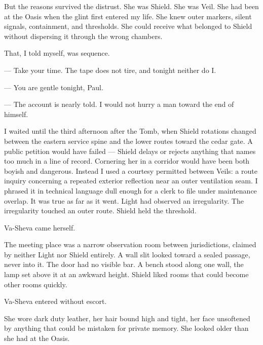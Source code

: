 But the reasons survived the distrust. She was Shield. She was Veil. She had been at the Oasis when the glint first entered my life. She knew outer markers, silent signals, containment, and thresholds. She could receive what belonged to Shield without dispersing it through the wrong chambers.\par

That, I told myself, was sequence.\par

\ornament

\begin{room}

--- Take your time. The tape does not tire, and tonight neither do I.

--- You are gentle tonight, Paul.

--- The account is nearly told. I would not hurry a man toward the end of himself.

\end{room}

\ornament

I waited until the third afternoon after the Tomb, when Shield rotations changed between the eastern service spine and the lower routes toward the cedar gate. A public petition would have failed --- Shield delays or rejects anything that names too much in a line of record. Cornering her in a corridor would have been both boyish and dangerous. Instead I used a courtesy permitted between Veils: a route inquiry concerning a repeated exterior reflection near an outer ventilation seam. I phrased it in technical language dull enough for a clerk to file under maintenance overlap. It was true as far as it went. Light had observed an irregularity. The irregularity touched an outer route. Shield held the threshold.\par

Va-Sheva came herself.\par

The meeting place was a narrow observation room between jurisdictions, claimed by neither Light nor Shield entirely. A wall slit looked toward a sealed passage, never into it. The door had no visible bar. A bench stood along one wall, the lamp set above it at an awkward height. Shield liked rooms that could become other rooms quickly.\par

Va-Sheva entered without escort.\par

She wore dark duty leather, her hair bound high and tight, her face unsoftened by anything that could be mistaken for private memory. She looked older than she had at the Oasis.\par

